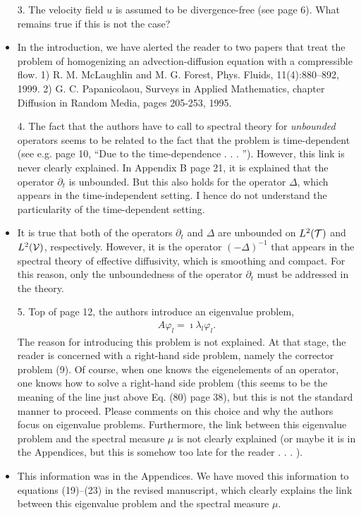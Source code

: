\documentclass[amsa]{article}
\begin{document}
\begin{itemize}
%
\item[3.] The velocity field $u$ is assumed to be divergence-free (see
  page 6). What remains true if this is not the case?  
%
\item In the introduction, we have alerted the reader to two papers
  that treat the problem of homogenizing an advection-diffusion
  equation with a compressible flow. 1) R. M. McLaughlin and
  M. G. Forest, Phys. Fluids, 11(4):880--892, 1999. 2)
  G. C. Papanicolaou, Surveys in Applied Mathematics, chapter
  Diffusion in Random Media, pages 205-253, 1995. 
%
\item[4.] The fact that the authors have to call to spectral theory
  for \emph{unbounded} operators seems to be related to the fact that
  the problem is time-dependent (see e.g. page 10, “Due to the
  time-dependence . . . ”). However, this link is never clearly
  explained. In Appendix B page 21, it is explained that the operator
  $\partial_t$ is unbounded. But this also holds for the operator $\Delta$, which
  appears in the time-independent setting. I hence do not understand
  the particularity of the time-dependent setting.  
%
\item It is true that both of the operators $\partial_t$ and $\Delta$ are
  unbounded on $L^2(\mathcal{T})$ and $L^2(\mathcal{V})$, respectively. However, it is
  the operator $(-\Delta)^{-1}$ that appears in the spectral theory of
  effective diffusivity, which is smoothing and compact. For this
  reason, only the unboundedness of the operator $\partial_t$ must be
  addressed in the theory.
 
%
\item[5.] Top of page 12, the authors introduce an eigenvalue problem,
  \begin{align}
    A\varphi_l=\imath\lambda_l\varphi_l. 
  \end{align}
  The reason for introducing this problem is not explained. At that
  stage, the reader is concerned with a right-hand side problem,
  namely the corrector problem (9). Of course, when one knows the
  eigenelements of an operator, one knows how to solve a right-hand
  side problem (this seems to be the meaning of the line just above
  Eq. (80) page 38), but this is not the standard manner to
  proceed. Please comments on this choice and why the authors focus on
  eigenvalue problems. Furthermore, the link between this eigenvalue
  problem and the spectral measure $\mu$ is not clearly explained (or
  maybe it is in the Appendices, but this is somehow too late for the
  reader . . . ). 
%
\item This information was in the Appendices. We have moved this 
  information to equations (19)--(23) in the revised manuscript, 
  which clearly explains the link between this eigenvalue   problem
  and the spectral measure $\mu$. 
 

\end{itemize}
\end{document}
